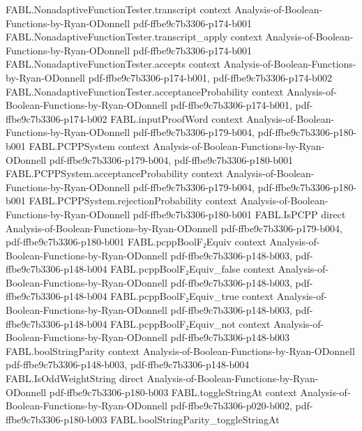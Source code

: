 \begin{theorem}
\proofstep
  {FABL.NonadaptiveFunctionTester.transcript}
  {context}
  {Analysis-of-Boolean-Functions-by-Ryan-ODonnell}
  {pdf-ffbe9c7b3306-p174-b001}
\proofstep
  {FABL.NonadaptiveFunctionTester.transcript_apply}
  {context}
  {Analysis-of-Boolean-Functions-by-Ryan-ODonnell}
  {pdf-ffbe9c7b3306-p174-b001}
\proofstep
  {FABL.NonadaptiveFunctionTester.accepts}
  {context}
  {Analysis-of-Boolean-Functions-by-Ryan-ODonnell}
  {pdf-ffbe9c7b3306-p174-b001,
    pdf-ffbe9c7b3306-p174-b002}
\proofstep
  {FABL.NonadaptiveFunctionTester.acceptanceProbability}
  {context}
  {Analysis-of-Boolean-Functions-by-Ryan-ODonnell}
  {pdf-ffbe9c7b3306-p174-b001,
    pdf-ffbe9c7b3306-p174-b002}
\proofstep
  {FABL.inputProofWord}
  {context}
  {Analysis-of-Boolean-Functions-by-Ryan-ODonnell}
  {pdf-ffbe9c7b3306-p179-b004,
    pdf-ffbe9c7b3306-p180-b001}
\proofstep
  {FABL.PCPPSystem}
  {context}
  {Analysis-of-Boolean-Functions-by-Ryan-ODonnell}
  {pdf-ffbe9c7b3306-p179-b004,
    pdf-ffbe9c7b3306-p180-b001}
\proofstep
  {FABL.PCPPSystem.acceptanceProbability}
  {context}
  {Analysis-of-Boolean-Functions-by-Ryan-ODonnell}
  {pdf-ffbe9c7b3306-p179-b004,
    pdf-ffbe9c7b3306-p180-b001}
\proofstep
  {FABL.PCPPSystem.rejectionProbability}
  {context}
  {Analysis-of-Boolean-Functions-by-Ryan-ODonnell}
  {pdf-ffbe9c7b3306-p180-b001}
\proofstep
  {FABL.IsPCPP}
  {direct}
  {Analysis-of-Boolean-Functions-by-Ryan-ODonnell}
  {pdf-ffbe9c7b3306-p179-b004,
    pdf-ffbe9c7b3306-p180-b001}
\proofstep
  {FABL.pcppBoolF₂Equiv}
  {context}
  {Analysis-of-Boolean-Functions-by-Ryan-ODonnell}
  {pdf-ffbe9c7b3306-p148-b003,
    pdf-ffbe9c7b3306-p148-b004}
\proofstep
  {FABL.pcppBoolF₂Equiv_false}
  {context}
  {Analysis-of-Boolean-Functions-by-Ryan-ODonnell}
  {pdf-ffbe9c7b3306-p148-b003,
    pdf-ffbe9c7b3306-p148-b004}
\proofstep
  {FABL.pcppBoolF₂Equiv_true}
  {context}
  {Analysis-of-Boolean-Functions-by-Ryan-ODonnell}
  {pdf-ffbe9c7b3306-p148-b003,
    pdf-ffbe9c7b3306-p148-b004}
\proofstep
  {FABL.pcppBoolF₂Equiv_not}
  {context}
  {Analysis-of-Boolean-Functions-by-Ryan-ODonnell}
  {pdf-ffbe9c7b3306-p148-b003}
\proofstep
  {FABL.boolStringParity}
  {context}
  {Analysis-of-Boolean-Functions-by-Ryan-ODonnell}
  {pdf-ffbe9c7b3306-p148-b003,
    pdf-ffbe9c7b3306-p148-b004}
\proofstep
  {FABL.IsOddWeightString}
  {direct}
  {Analysis-of-Boolean-Functions-by-Ryan-ODonnell}
  {pdf-ffbe9c7b3306-p180-b003}
\proofstep
  {FABL.toggleStringAt}
  {context}
  {Analysis-of-Boolean-Functions-by-Ryan-ODonnell}
  {pdf-ffbe9c7b3306-p020-b002,
    pdf-ffbe9c7b3306-p180-b003}
\proofstep
  {FABL.boolStringParity_toggleStringAt}

\end{theorem}
